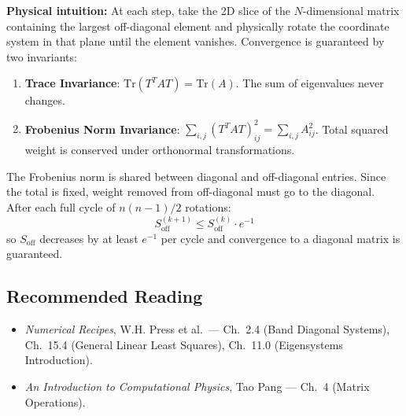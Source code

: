 \noindent\textbf{Physical intuition:} At each step, take the 2D slice of
the $N$-dimensional matrix containing the largest off-diagonal element and
physically rotate the coordinate system in that plane until the element
vanishes. Convergence is guaranteed by two invariants:
\begin{enumerate}
    \item \textbf{Trace Invariance}: $\mathrm{Tr}(T^T A T) = \mathrm{Tr}(A)$.
    The sum of eigenvalues never changes.
    \item \textbf{Frobenius Norm Invariance}: $\sum_{i,j}(T^T A T)_{ij}^2 =
    \sum_{i,j} A_{ij}^2$. Total squared weight is conserved under orthonormal
    transformations.
\end{enumerate}

\begin{tcolorbox}[colback=green!5!white,colframe=green!50!black,
  title=Why the Algorithm Must Converge]
The Frobenius norm is shared between diagonal and off-diagonal entries. Since
the total is fixed, weight removed from off-diagonal must go to the diagonal.
After each full cycle of $n(n-1)/2$ rotations:
\begin{equation}
S_{\text{off}}^{(k+1)} \leq S_{\text{off}}^{(k)} \cdot e^{-1}
\end{equation}
so $S_{\text{off}}$ decreases by at least $e^{-1}$ per cycle and convergence
to a diagonal matrix is guaranteed.
\end{tcolorbox}

\subsection*{Recommended Reading}
\begin{itemize}
    \item \textit{Numerical Recipes}, W.H. Press et al.\ --- Ch.\ 2.4 (Band
    Diagonal Systems), Ch.\ 15.4 (General Linear Least Squares), Ch.\ 11.0
    (Eigensystems Introduction).
    \item \textit{An Introduction to Computational Physics}, Tao Pang ---
    Ch.\ 4 (Matrix Operations).
\end{itemize}
